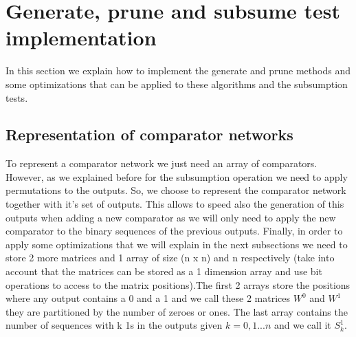 \documentclass[../main.tex]{subfiles}
\begin{document}
	\section{Generate, prune and subsume test implementation}
	In this section we explain how to implement the generate and prune methods and some optimizations that can be applied to these algorithms and the subsumption tests.
	
	\subsection{Representation of comparator networks}
	To represent a comparator network we just need an array of comparators. However, as we explained before for the subsumption operation we need to apply permutations to the outputs. So, we choose to represent the comparator network together with it's set of outputs. This allows to speed also the generation of this outputs when adding a new comparator as we will only need to apply the new comparator to the binary sequences of the previous outputs. Finally, in order to apply some optimizations that we will explain in the next subsections we need to store 2 more matrices and 1 array of size (n x n) and n respectively (take into account that the matrices can be stored as a 1 dimension array and use bit operations to access to the matrix positions).The first 2 arrays store the positions where any output contains a 0 and a 1 and we call  these 2 matrices $W^0$ and $W^1$ they are partitioned by the number of zeroes or ones. The last array contains the number of sequences with k 1s in the outputs given $k=0,1...n$ and we call it $S^{1}_k$.
	
\end{document}
